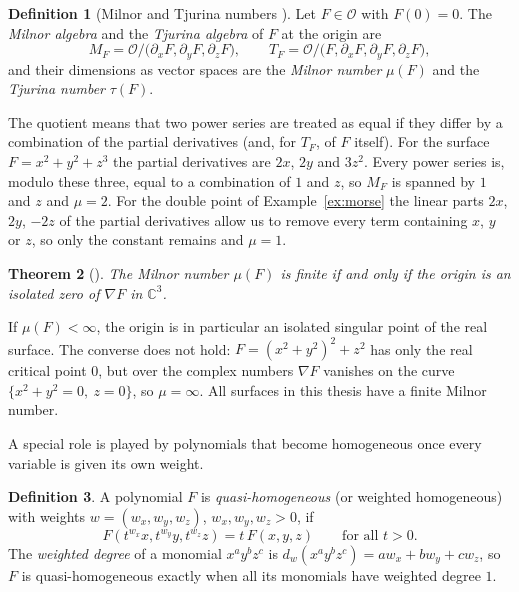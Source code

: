 \documentclass[12pt, a4paper, oneside]{book}
\theoremstyle{plain}
\newtheorem{theorem}{Theorem}[chapter]
\theoremstyle{definition}
\newtheorem{definition}[theorem]{Definition}
\theoremstyle{remark}
\theoremstyle{definition}
\begin{document}
\begin{definition}[Milnor and Tjurina numbers \cite{milnor1968singular,greuel2007introduction}]
\label{def:milnor}
Let $F\in\mathcal{O}$ with $F(0)=0$. The \emph{Milnor algebra} and the \emph{Tjurina algebra} of $F$ at the origin are
\[
M_F=\mathcal{O}\big/\big(\partial_xF,\partial_yF,\partial_zF\big),\qquad
T_F=\mathcal{O}\big/\big(F,\partial_xF,\partial_yF,\partial_zF\big),
\]
and their dimensions as vector spaces are the \emph{Milnor number} $\mu(F)$ and the \emph{Tjurina number} $\tau(F)$.
\end{definition}

The quotient means that two power series are treated as equal if they differ by a combination of the partial derivatives (and, for $T_F$, of $F$ itself). For the surface $F=x^2+y^2+z^3$ the partial derivatives are $2x$, $2y$ and $3z^2$. Every power series is, modulo these three, equal to a combination of $1$ and $z$, so $M_F$ is spanned by $1$ and $z$ and $\mu=2$. For the double point of Example~\ref{ex:morse} the linear parts $2x$, $2y$, $-2z$ of the partial derivatives allow us to remove every term containing $x$, $y$ or $z$, so only the constant remains and $\mu=1$.

\begin{theorem}[\cite{greuel2007introduction}]
\label{thm:mu-finite}
The Milnor number $\mu(F)$ is finite if and only if the origin is an isolated zero of $\nabla F$ in $\mathbb{C}^3$.
\end{theorem}

If $\mu(F)<\infty$, the origin is in particular an isolated singular point of the real surface. The converse does not hold: $F=(x^2+y^2)^2+z^2$ has only the real critical point $0$, but over the complex numbers $\nabla F$ vanishes on the curve $\{x^2+y^2=0,\ z=0\}$, so $\mu=\infty$. All surfaces in this thesis have a finite Milnor number.

A special role is played by polynomials that become homogeneous once every variable is given its own weight.

\begin{definition}
\label{def:quasihomogeneous}
A polynomial $F$ is \emph{quasi-homogeneous} (or weighted homogeneous) with weights $w=(w_x,w_y,w_z)$, $w_x,w_y,w_z>0$, if
\[
F(t^{w_x}x,t^{w_y}y,t^{w_z}z)=t\,F(x,y,z)\qquad\text{for all }t>0.
\]
The \emph{weighted degree} of a monomial $x^ay^bz^c$ is $d_w(x^ay^bz^c)=aw_x+bw_y+cw_z$, so $F$ is quasi-homogeneous exactly when all its monomials have weighted degree $1$.
\end{definition}
\end{document}
